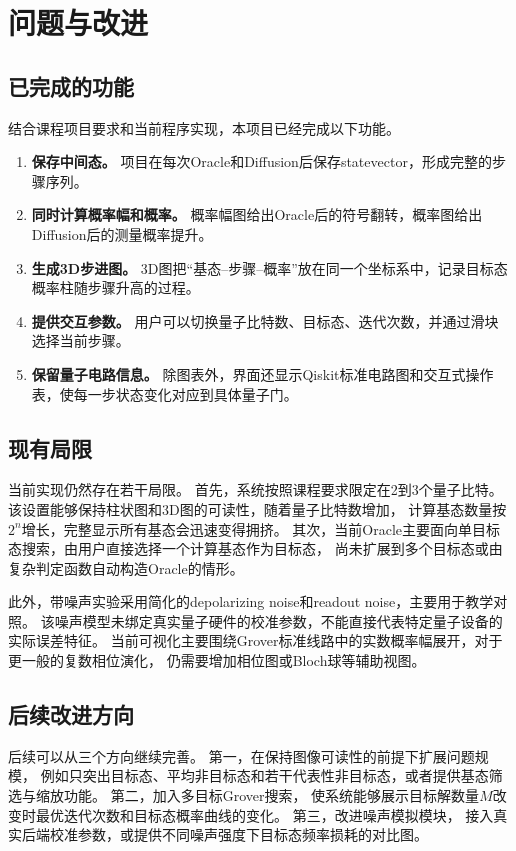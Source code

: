 \section{问题与改进}

\subsection{已完成的功能}

结合课程项目要求和当前程序实现，本项目已经完成以下功能。

\begin{enumerate}
  \item \textbf{保存中间态。} 项目在每次Oracle和Diffusion后保存statevector，形成完整的步骤序列。
  \item \textbf{同时计算概率幅和概率。} 概率幅图给出Oracle后的符号翻转，概率图给出Diffusion后的测量概率提升。
  \item \textbf{生成3D步进图。} 3D图把“基态--步骤--概率”放在同一个坐标系中，记录目标态概率柱随步骤升高的过程。
  \item \textbf{提供交互参数。} 用户可以切换量子比特数、目标态、迭代次数，并通过滑块选择当前步骤。
  \item \textbf{保留量子电路信息。} 除图表外，界面还显示Qiskit标准电路图和交互式操作表，使每一步状态变化对应到具体量子门。
\end{enumerate}

\subsection{现有局限}

当前实现仍然存在若干局限。
首先，系统按照课程要求限定在2到3个量子比特。
该设置能够保持柱状图和3D图的可读性，随着量子比特数增加，
计算基态数量按\(2^n\)增长，完整显示所有基态会迅速变得拥挤。
其次，当前Oracle主要面向单目标态搜索，由用户直接选择一个计算基态作为目标态，
尚未扩展到多个目标态或由复杂判定函数自动构造Oracle的情形。

此外，带噪声实验采用简化的depolarizing noise和readout noise，主要用于教学对照。
该噪声模型未绑定真实量子硬件的校准参数，不能直接代表特定量子设备的实际误差特征。
当前可视化主要围绕Grover标准线路中的实数概率幅展开，对于更一般的复数相位演化，
仍需要增加相位图或Bloch球等辅助视图。

\subsection{后续改进方向}

后续可以从三个方向继续完善。
第一，在保持图像可读性的前提下扩展问题规模，
例如只突出目标态、平均非目标态和若干代表性非目标态，或者提供基态筛选与缩放功能。
第二，加入多目标Grover搜索，
使系统能够展示目标解数量\(M\)改变时最优迭代次数和目标态概率曲线的变化。
第三，改进噪声模拟模块，
接入真实后端校准参数，或提供不同噪声强度下目标态频率损耗的对比图。